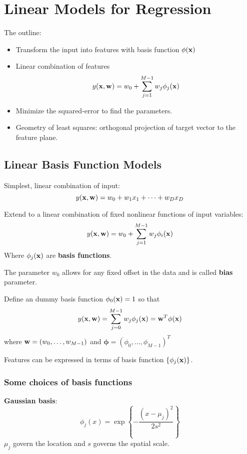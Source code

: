 \chapter{Linear Models for Regression}
The outline:
\begin{itemize}
    \item Transform the input into features with basis function
        $\phi(\mathbf{x})$
    \item Linear combination of features
        \[
            y(\mathbf{x}, \mathbf{w}) = w_0 + \sum_{j=1}^{M-1}w_j\phi_j(\mathbf{x})
        \]
    \item Minimize the squared-error to find the parameters.
    \item Geometry of least squares: orthogonal projection of target
        vector to the feature plane.
\end{itemize}
\section{Linear Basis Function Models}
Simplest, linear combination of input:
\begin{equation}
    y(\mathbf{x}, \mathbf{w}) = w_0 + w_1 x_1 + \cdots + w_D x_D
\end{equation}

Extend to a linear combination of fixed nonlinear functions of input
variables:
\begin{equation}
    y(\mathbf{x}, \mathbf{w}) = w_0 + \sum_{j=1}^{M-1} w_j \phi_i(\mathbf{x})
\end{equation}
Where $\phi_j(\mathbf{x})$ are \textbf{basis functions}.

The parameter $w_0$ allows for any fixed offset in the data and is called
\textbf{bias} parameter.

Define an dummy basis function $\phi_0(\mathbf{x}) = 1$ so that 
\begin{equation}
    y(\mathbf{x}, \mathbf{w}) = \sum_{j=0}^{M-1}w_j \phi_j(\mathbf{x}) = \mathbf{w}^T \phi(\mathbf{x})
\end{equation}
where $\mathbf{w} = (w_0, \dots, w_{M-1})$ and $\boldsymbol\phi = {(\phi_0, \dots,
\phi_{M-1})}^T$

Features can be expressed in terms of basis function $\{\phi_j(\mathbf{x})\}$.

\subsection{Some choices of basis functions}
\textbf{Gaussian basis}:
\begin{equation}
    \phi_j(x) = \exp\left\{ -\frac{{(x-\mu_j)}^2}{2s^2} \right\}
\end{equation}
$\mu_j$ govern the location and $s$ governs the spatial scale.

